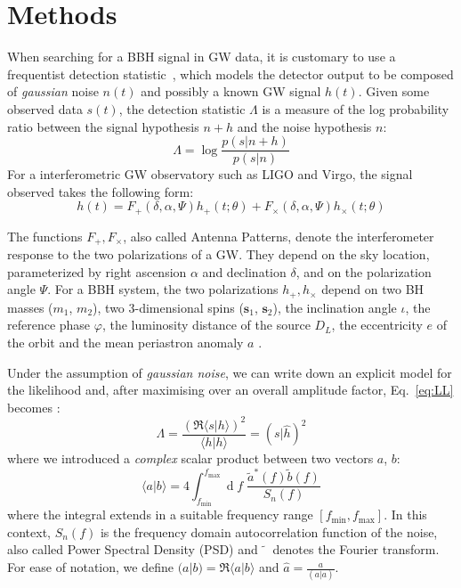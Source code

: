 \documentclass[twocolumn,showpacs,preprintnumbers,nofootinbib,prd,
superscriptaddress,10pt]{revtex4-2}
\renewcommand{\d}[1]{\ensuremath{\operatorname{d}\!{#1}}}
\newcommand{\scalar}[2]{\langle #1|#2 \rangle}
\newcommand{\rescalar}[2]{( #1 |#2 )}
\begin{document}
\section{Methods} \label{sec:methods}

When searching for a BBH signal in GW data, it is customary to use a frequentist detection statistic~\cite{Creighton_book, Maggiore:2007ulw, Harry:2016ijz, Harry:2017weg}, which models the detector output to be composed of {\it gaussian} noise $n(t)$ and possibly a known GW signal $h(t)$.
Given some observed data $s(t)$, the detection statistic $\Lambda$ is a measure of the log probability ratio between the signal hypothesis $n+h$ and the noise hypothesis $n$:
\begin{equation}\label{eq:LL}
	\Lambda = \log\frac{p(s|n+h)}{p(s| n)}
\end{equation}
For a interferometric GW observatory such as LIGO and Virgo, the signal observed takes the following form:
\begin{equation}\label{eq:signal_model}
	h(t) = F_+(\delta, \alpha, \Psi) h_+(t;\theta) + F_\times(\delta, \alpha, \Psi) h_\times(t;\theta)
\end{equation}

The functions $F_+, F_\times$, also called Antenna Patterns, denote the interferometer response to the two polarizations of a GW. They depend on the sky location, parameterized by right ascension $\alpha$ and declination $\delta$, and on the polarization angle $\Psi$. 
For a BBH system, the two polarizations $h_+, h_\times$ depend on two BH masses ($m_1$, $m_2$), two 3-dimensional spins ($\mathbf{s}_1$, $\mathbf{s}_2$), the inclination angle $\iota$, the reference phase $\varphi$, the luminosity distance of the source $D_L$, the eccentricity $e$ of the orbit and the mean periastron anomaly $a$ \cite{Sathyaprakash_2009}.

Under the assumption of {\it gaussian noise}, we can write down an explicit model for the likelihood and, after maximising over an overall amplitude factor, Eq.~\eqref{eq:LL} becomes \cite{Creighton_book, Maggiore:2007ulw, Harry:2016ijz}:
\begin{equation}\label{eq:LL_gauss}
	\Lambda = \frac{\left(\Re\scalar{s}{h}\right)^2}{\scalar{h}{h}} = \rescalar{s}{\hat{h}}^2
\end{equation}
where we introduced a {\it complex} scalar product between two vectors $a$, $b$:
\begin{equation} \label{eq:scalar_product}
	\scalar{a}{b} = 4 \int_{f_\text{min}}^{f_\text{max}} \!\!\!\! \d{f} \; \frac{\tilde{a}^*(f) \tilde{b}(f)}{S_n(f)}
\end{equation}
where the integral extends in a suitable frequency range $[f_\text{min}, f_\text{max}]$.
In this context, $S_n(f)$ is the frequency domain autocorrelation function of the noise, also called Power Spectral Density (PSD) and $\tilde{\phantom{a}}$ denotes the Fourier transform.
For ease of notation, we define ${\rescalar{a}{b} = \Re\scalar{a}{b}}$ and ${\hat{a} = \frac{a}{\rescalar{a}{a}}}$.
\end{document}

